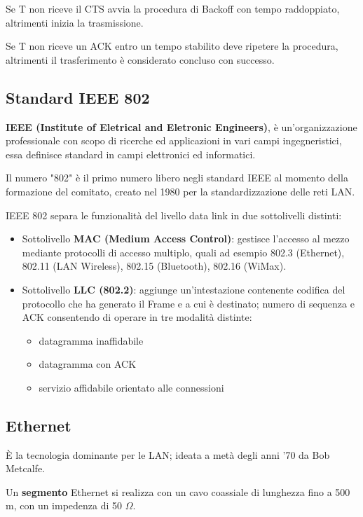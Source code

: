             Se T non riceve il CTS avvia la procedura di Backoff con tempo raddoppiato, altrimenti inizia la trasmissione.

            Se T non riceve un ACK entro un tempo stabilito deve ripetere la procedura, altrimenti il trasferimento è considerato concluso con successo.

    \subsection{Standard IEEE 802}
        \textbf{IEEE (Institute of Eletrical and Eletronic Engineers)}, è un'organizzazione professionale con scopo di ricerche ed applicazioni in vari campi ingegneristici, essa definisce standard in campi elettronici ed informatici.

        Il numero "802" è il primo numero libero negli standard IEEE al momento della formazione del comitato, creato nel 1980 per la standardizzazione delle reti LAN.

        IEEE 802 separa le funzionalità del livello data link in due sottolivelli distinti:
        \begin{itemize}
            \item Sottolivello \textbf{MAC (Medium Access Control)}: gestisce l'accesso al mezzo mediante protocolli di accesso multiplo, quali ad esempio 802.3 (Ethernet), 802.11 (LAN Wireless), 802.15 (Bluetooth), 802.16 (WiMax).
            \item Sottolivello \textbf{LLC (802.2)}: aggiunge un'intestazione contenente codifica del protocollo che ha generato il Frame e a cui è destinato; numero di sequenza e ACK consentendo di operare in tre modalità distinte:
            \begin{itemize}
                \item datagramma inaffidabile
                \item datagramma con ACK
                \item servizio affidabile orientato alle connessioni
            \end{itemize}
        \end{itemize}

    \subsection{Ethernet}
        È la tecnologia dominante per le LAN; ideata a metà degli anni '70 da Bob Metcalfe.
    
        Un \textbf{segmento} Ethernet si realizza con un cavo coassiale di lunghezza fino a 500 m, con un impedenza di 50 $\Omega$.
    
